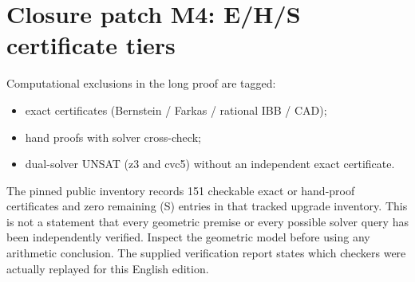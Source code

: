 \documentclass[11pt,reqno]{amsart}
\theoremstyle{definition}
\begin{document}
\section{Closure patch M4: E/H/S certificate tiers}\label{app:M4}

Computational exclusions in the long proof are tagged:
\begin{itemize}[leftmargin=*]
\item[(E)] exact certificates (Bernstein / Farkas / rational IBB / CAD);
\item[(H)] hand proofs with solver cross-check;
\item[(S)] dual-solver UNSAT (z3 and cvc5) without an independent exact
certificate.
\end{itemize}
The pinned public inventory records 151 checkable exact or hand-proof
certificates and zero remaining (S) entries in that tracked upgrade inventory.
This is not a statement that every geometric premise or every possible solver
query has been independently verified. Inspect the geometric model before
using any arithmetic conclusion. The supplied verification report states
which checkers were actually replayed for this English edition.



\end{document}
